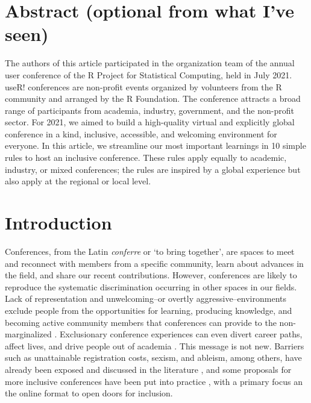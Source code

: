 \documentclass[10pt,letterpaper]{article}
\begin{document}
\section*{Abstract (optional from what I've seen)}

The authors of this article participated in the organization team of the annual user conference of the R Project for Statistical Computing, held in July 2021. useR! conferences are non-profit events organized by volunteers from the R community and arranged by the R Foundation. The conference attracts a broad range of participants from academia, industry, government, and the non-profit sector. For 2021, we aimed to build a high-quality virtual and explicitly global conference in a kind, inclusive, accessible, and welcoming environment for everyone. 
In this article, we streamline our most important learnings in 10 simple rules to host an inclusive conference. These rules apply equally to academic, industry, or mixed conferences; the rules are inspired by a global experience but also apply at the regional or local level.





\linenumbers

\section*{Introduction}

Conferences, from the Latin \textit{conferre} or `to bring together', are spaces to meet and reconnect with members from a specific community, learn about advances in the field, and share our recent contributions. 
However, conferences are likely to reproduce the systematic discrimination occurring in other spaces in our fields. 
Lack of representation and unwelcoming--or overtly aggressive--environments exclude people from the opportunities for learning, producing knowledge, and becoming active community members that conferences can provide to the non-marginalized \cite{hendersonThoughtfulGatheringsGendering2020}.
Exclusionary conference experiences can even divert career paths, affect lives, and drive people out of academia \cite{biggsAcademicConferenceChilly2018, hendersonThoughtfulGatheringsGendering2020}. 
This message is not new. 
Barriers such as unattainable registration costs, sexism, and ableism, among others, have already been exposed and discussed in the literature \cite{arendDisparityConferenceRegistration2019, biggsAcademicConferenceChilly2018, depickerRethinkingInclusionDisability2020a, irishIncreasingParticipationUsing2020}, 
and some proposals for more inclusive conferences have been put into practice \cite{gichoraTenSimpleRules2010a, levitisCenteringInclusivityDesign2021, atkinsonJournalMedicine20202021, foramittiVirtuesVirtualConferences2021, ninerBetterWhomLeveling2021, rabyMovingAcademicConferences2021}, with a primary focus an the online format to open doors for inclusion. 
\end{document}
